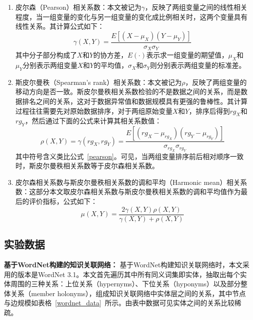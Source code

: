 \begin{enumerate}
    \item 皮尔森（Pearson）相关系数：本文被记为$\gamma$，反映了两组变量之间的线性相关程度，当一组变量的变化与另一组变量的变化成比例相关时，这两个变量具有线性关系。其计算公式如下：
    \begin{equation}
        \label{pearson}
        \gamma(X, Y) = \frac{E[(X-\mu_X)(Y-\mu_Y)]}{\sigma_X \sigma_Y}
    \end{equation}
    \noindent 其中分子部分构成了$X$和$Y$的协方差，$E(\cdot)$表示求一组变量的期望值，$\mu_X$和$\mu_Y$分别表示两组变量$X$和$Y$的平均值，$\sigma_X$和$\sigma_Y$则分别表示两组变量的标准差。
    \item 斯皮尔曼秩（Spearman's rank）相关系数：本文被记为$\rho$，反映了两组变量的移动方向是否一致。斯皮尔曼秩相关系数检验的不是数据之间的关系，而是数据排名之间的关系，这对于数据异常值和数据规模具有更强的鲁棒性。其计算过程往往需要先对原始数据排序，对于两组原始变量$X$和$Y$，排序后得到$rg_X$和$rg_Y$，然后通过下面的公式来计算其相关系数值：
    \begin{equation}
        \label{spearman}
        \rho(X, Y) = \gamma(rg_X, rg_Y) =  \frac{E[(rg_X-\mu_{rg_X})(rg_Y-\mu_{rg_Y})]}{\sigma_{rg_X} \sigma_{rg_Y}}
    \end{equation}
    \noindent 其中符号含义类比公式~\ref{pearson}。可见，当两组变量排序前后相对顺序一致时，斯皮尔曼秩相关系数等于皮尔森相关系数。
    \item 皮尔森相关系数与斯皮尔曼秩相关系数的调和平均（Harmonic mean）相关系数：这部分本文取皮尔森相关系数与斯皮尔曼秩相关系数的调和平均值作为最后的评价指标，公式如下：
    \begin{equation}
        \label{harmonic}
        \mu(X, Y) = \frac{2\gamma(X, Y)\rho(X, Y)}{\gamma(X, Y)+\rho(X, Y)}
    \end{equation}
\end{enumerate}

\subsection{实验数据}

\textbf{基于WordNet构建的知识关联网络：}
基于WordNet构建知识关联网络时，本文采用的版本是WordNet 3.1。本文首先遍历其中所有同义词集即实体，抽取出每个实体周围的三种关系：上位关系（hypernyms）、下位关系（hyponyms）以及部分整体关系（member holonyms），组成知识关联网络中实体层之间的关系，其中节点与边规模如表格~\ref{wordnet_data}~所示。由表中数据可见实体之间的关系比较稀疏。

